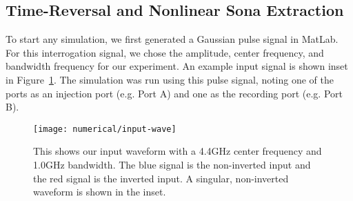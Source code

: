 \subsection{Time-Reversal and Nonlinear Sona Extraction}
To start any simulation, we first generated a Gaussian pulse signal in MatLab. For this interrogation signal, we chose the amplitude, center frequency, and bandwidth frequency for our experiment. An example input signal is shown inset in Figure~\ref{fig:numerical-input-wave}. The simulation was run using this pulse signal, noting one of the ports as an injection port (e.g. Port A) and one as the recording port (e.g. Port B).


\begin{figure}[t]
\centering
\texttt{[image: numerical/input-wave]}
\caption[Example of inverted and non-inverted interrogation signals]{This shows our input waveform with a 4.4GHz center frequency and 1.0GHz bandwidth. The blue signal is the non-inverted input and the red signal is the inverted input. A singular, non-inverted waveform is shown in the inset.}
\label{fig:numerical-input-wave}
\end{figure}

